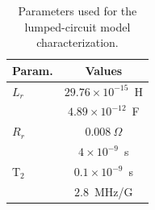 \begin{table}[htp]
\centering
\caption{Parameters used for the lumped-circuit model characterization.}
\begin{tabular}{l|c}
\multicolumn{1}{l|}{Param.} & \multicolumn{1}{c}{Values} \\ \hline \hline
\multicolumn{1}{l|}{$L_r$} & \multicolumn{1}{c}{$29.76\times 10^{-15}$~H} \\
\rowcolor[rgb]{0.937,0.937,0.937}  
\multicolumn{1}{l|}{$C_r$} & \multicolumn{1}{c}{$4.89\times 10^{-12} $~F} \\
\multicolumn{1}{l|}{$R_r$} & \multicolumn{1}{c}{$0.008~\Omega$} \\
\rowcolor[rgb]{0.937,0.937,0.937}  
\multicolumn{1}{l|}{T$_1$} & \multicolumn{1}{c}{$4\times 10^{-9}$~s} \\
\multicolumn{1}{l|}{T$_2$} & \multicolumn{1}{c}{$0.1\times 10^{-9}$~s} \\
\rowcolor[rgb]{0.937,0.937,0.937}  
\multicolumn{1}{l|}{$\gamma$} & \multicolumn{1}{c}{$2.8$~MHz/G}
\end{tabular}\label{ch3-table:lumpedparameters}
\end{table}

